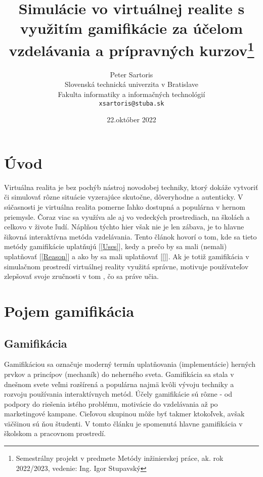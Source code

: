 \documentclass[10pt,slovak,a4paper]{article}
\title{Simulácie vo virtuálnej realite s využitím gamifikácie za účelom vzdelávania a prípravných kurzov\thanks{Semestrálny projekt v predmete Metódy inžinierskej práce, ak. rok 2022/2023, vedenie: Ing. Igor Stupavský}}
\author{Peter Sartoris\\[2pt]
	{\small Slovenská technická univerzita v Bratislave}\\
	{\small Fakulta informatiky a informačných technológií}\\
	{\small \texttt{xsartoris@stuba.sk}}
	}
\date{\small 22.október 2022}
\begin{document}
\maketitle


\section{Úvod} \label{Abstract}

Virtuálna realita je bez pochýb nástroj novodobej techniky, ktorý dokáže vytvoriť či simulovať rôzne situácie vyzerajúce skutočne, dôveryhodne a autenticky.
V súčasnosti je virtuálna realita pomerne ľahko dostupná a populárna v hernom priemysle. Čoraz viac sa využíva ale aj vo vedeckých prostrediach, na školách a celkovo v živote ľudí. 
Náplňou týchto hier však nie je len zábava, je to hlavne šikovná interaktívna metóda vzdelávania.
Tento článok hovorí o tom, kde sa tieto metódy gamifikácie uplatňujú [\ref{Uses}], kedy a prečo by sa mali (nemali) uplatňovať [\ref{Reason}] a ako by sa mali uplatňovať [\ref{}]. 
Ak je totiž gamifikácia v simulačnom prostredí  virtuálnej reality využitá správne, motivuje používateľov zlepšovať svoje zručnosti v tom , čo sa práve učia.


\section{Pojem gamifikácia} \label{Gamification}

\subsection{Gamifikácia} \label{Gamification:gamification}

Gamifikáciou sa označuje moderný termín uplatňovania (implementácie) herných prvkov a princípov (mechaník) do neherného sveta.
 Gamifikácia sa stala v dnešnom svete veľmi rozšírená a populárna najmä kvôli vývoju techniky a rozvoju používania interaktívnych metód.
Účely gamifikácie sú rôzne - od podpory do riešenia istého problému, motivácie do vzdelávania až po marketingové kampane. 
Cieľovou skupinou môže byť takmer ktokoľvek, avšak väčšinou sú ňou študenti. V tomto článku je spomenutá hlavne gamifikácia v školskom a pracovnom prostredí. \newline \newline
\end{document}
